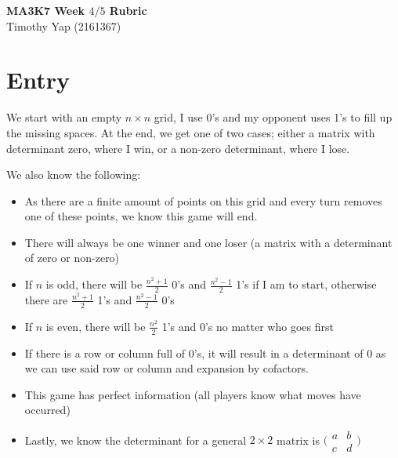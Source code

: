 \documentclass[11pt]{article}
\newcommand{\keywordfont}{\textsc}
\newcommand{\keyword}[1]{%
  \marginpar{\raggedright\small\keywordfont{#1}}}
\begin{document}
\Large
\begin{center}
\textbf{MA3K7 Week $4/5$ Rubric}
\\
Timothy Yap (2161367)
\end{center}
\normalsize











\section{Entry}

We start \keyword{I know} with an empty $n \times n$ grid, I use 0's and my opponent uses 1's to fill up the missing spaces. At the end, we get one of two cases; either a matrix with determinant zero, where I win, or a non-zero determinant, where I lose. 

    We also know the following:
\begin{itemize}
    \item As there are a finite amount of points on this grid and every turn removes one of these points, we know this game will end.
    \item There will always be one winner and one loser (a matrix with a determinant of zero or non-zero)
    \item If $n$ is odd, there will be $\frac{n^2+1}{2}$ 0's and $\frac{n^2-1}{2}$ 1's if I am to start, otherwise there are $\frac{n^2+1}{2}$ 1's and $\frac{n^2-1}{2}$ 0's
    \item If $n$ is even, there will be $\frac{n^2}{2}$ 1's and 0's no matter who goes first
    \item If there is a row or column full of 0's, it will result in a determinant of 0 as we can use said row or column and expansion by cofactors.
    \item This game has perfect information (all players know what moves have occurred) 
    \item Lastly, we know the determinant for a general $2 \times 2$ matrix is 
    $\big(\begin{smallmatrix} 
    a & b\\
    c & d\end{smallmatrix}\big)$
\end{itemize}
\end{document}
